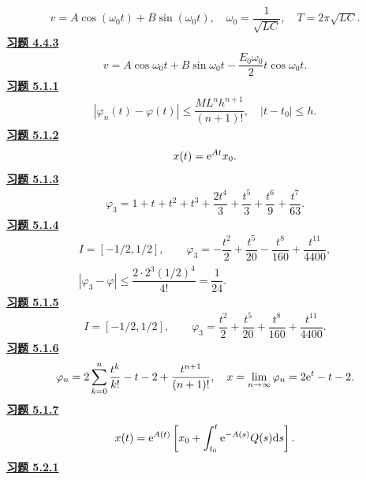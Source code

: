 \[\begin{gathered}v=A\cos(\omega_0t)+B\sin(\omega_0t),\quad \omega_0=\dfrac1{\sqrt{LC}},\quad T=2\pi\sqrt{LC}.\end{gathered}\]
\noindent\textbf{\hyperref[q:4.4.3]{习题 4.4.3}}
\[\begin{gathered}v=A\cos\omega_0t+B\sin\omega_0t-\dfrac{E_0\omega_0}{2}t\cos\omega_0t.\end{gathered}\]
\noindent\textbf{\hyperref[q:5.1.1]{习题 5.1.1}}
\[\begin{gathered}|\varphi_n(t)-\varphi(t)|\le\dfrac{ML^nh^{n+1}}{(n+1)!},\quad |t-t_0|\le h.\end{gathered}\]
\noindent\textbf{\hyperref[q:5.1.2]{习题 5.1.2}}
\[\begin{gathered}x(t)=\mathrm e^{At}x_0.\end{gathered}\]
\noindent\textbf{\hyperref[q:5.1.3]{习题 5.1.3}}
\[\begin{gathered}\varphi_3=1+t+t^2+t^3+\dfrac{2t^4}{3}+\dfrac{t^5}{3}+\dfrac{t^6}{9}+\dfrac{t^7}{63}.\end{gathered}\]
\noindent\textbf{\hyperref[q:5.1.4]{习题 5.1.4}}
\[\begin{gathered}I=[-1/2,1/2],\qquad
\varphi_3=-\dfrac{t^2}{2}+\dfrac{t^5}{20}-\dfrac{t^8}{160}+\dfrac{t^{11}}{4400},\\
|\varphi_3-\varphi|\le\dfrac{2\cdot2^3(1/2)^4}{4!}=\dfrac1{24}.\end{gathered}\]
\noindent\textbf{\hyperref[q:5.1.5]{习题 5.1.5}}
\[\begin{gathered}I=[-1/2,1/2],\qquad
\varphi_3=\dfrac{t^2}{2}+\dfrac{t^5}{20}+\dfrac{t^8}{160}+\dfrac{t^{11}}{4400}.\end{gathered}\]
\noindent\textbf{\hyperref[q:5.1.6]{习题 5.1.6}}
\[\begin{gathered}\varphi_n=2\sum_{k=0}^n\dfrac{t^k}{k!}-t-2+\dfrac{t^{n+1}}{(n+1)!},\quad
x=\lim_{n\to\infty}\varphi_n=2\mathrm e^t-t-2.\end{gathered}\]
\noindent\textbf{\hyperref[q:5.1.7]{习题 5.1.7}}
\[\begin{gathered}x(t)=\mathrm e^{A(t)}\left[x_0+\int_{t_0}^t\mathrm e^{-A(s)}Q(s)\mathrm d s\right].\end{gathered}\]
\noindent\textbf{\hyperref[q:5.2.1]{习题 5.2.1}}
